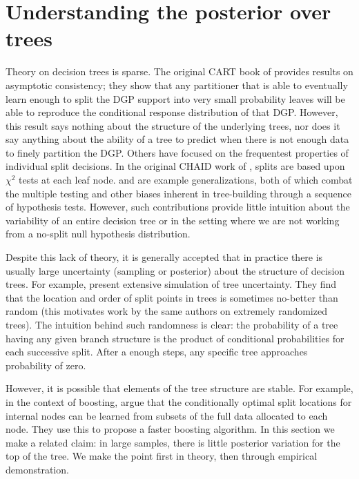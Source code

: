\documentclass{article}
\begin{document}
    
    

\section{Understanding the posterior over trees}\label{treeuncertainty}


Theory on decision trees is sparse. The original CART book of
\citet{breiman_classification_1984} provides results on asymptotic consistency;
they show that any partitioner that is able to eventually learn enough to
split the DGP support into very small probability leaves will be able to
reproduce the conditional response distribution of that DGP. However, this
result says nothing about the structure of the underlying trees, nor does it
say anything about the ability of a tree to predict when there is not enough
data to finely partition the DGP.  Others have focused on the frequentest
properties of individual split decisions. In the original CHAID work of
\citet{kass_exploratory_1980}, splits are based upon $\chi^2$ tests at each
leaf node. \citet{loh_regression_2002} and
\citet{hothorn_unbiased_2006} are example generalizations, both of which
combat the multiple testing and other biases inherent in
tree-building through a sequence of hypothesis tests. However, such
contributions provide little intuition about the variability of an
entire decision tree or in the setting where we are not working from a
no-split null hypothesis distribution.

Despite this lack of theory, it is generally accepted that in practice there is
usually  large  uncertainty (sampling or posterior) about the
structure of decision trees. For example, \citet{geurts_investigation_2000}
present extensive simulation of tree
uncertainty. They find that the location and order of split points in
trees is sometimes no-better than random (this motivates work by the
same authors on extremely randomized trees). The intuition behind such randomness
is clear: the probability of a tree having any given branch structure is the
product of conditional probabilities for each successive split. After a enough
steps, any specific tree approaches probability of zero. 

However, it is possible that elements of the tree structure are
 stable. For example, in the context of boosting,
\citet{appel_quickly_2013} argue that the conditionally optimal
split locations for internal nodes can be learned from
subsets of the full data allocated to each node.  They use this to propose
a faster boosting algorithm. In this section we make a related claim: 
in large samples, there is little posterior variation for the top of the tree. 
We make the point first in theory, then through empirical demonstration.
\end{document}

